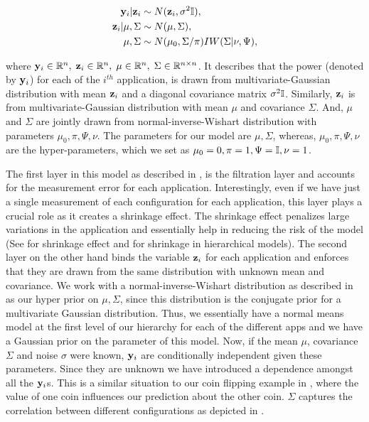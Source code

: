 \begin{equation}
\begin{aligned}
\mathbf{y}_i \vert \mathbf{z}_i  &\sim N( \mathbf{z}_i, \sigma^2 \mathbb{I}),\\
\mathbf{z}_i \vert \mu,\Sigma &\sim N(\mu, \Sigma),\\
\mu, \Sigma &\sim N(\mu_0,\Sigma / \pi)IW(\Sigma | \nu, \Psi),
\end{aligned}
\label{eq:HBN}
\end{equation}

where $\mathbf{y}_i \in \mathbb{R}^n, \;
\mathbf{z}_i \in \mathbb{R}^n, \;
\mu \in \mathbb{R}^{n}, \;
\Sigma \in \mathbb{R}^{n\times n}$. It describes that the power (denoted by $\mathbf{y}_i$) for each of the $i^{th}$ application,  is drawn from multivariate-Gaussian distribution with mean $\mathbf{z}_i$ and a diagonal covariance matrix $\sigma^2\mathbb{I}$. Similarly, $\mathbf{z}_i$ is from multivariate-Gaussian distribution with mean $\mu$ and covariance $\Sigma$. And, $\mu$ and $\Sigma$ are jointly drawn from normal-inverse-Wishart distribution with parameters  $\mu_0, \pi,\Psi, \nu$. The parameters for our model are $\mu,\Sigma$, whereas,  $\mu_0, \pi,\Psi, \nu$ are the hyper-parameters, which we set as $\mu_0 = 0, \pi = 1,\Psi = \mathbb{I}, \nu = 1$.

The first layer in this model as described in , is the filtration layer and accounts for the measurement error for each application. Interestingly, even if we have just a single measurement of each configuration for each application, this layer plays a crucial role as it creates a shrinkage effect. The shrinkage effect penalizes large variations in the application and essentially help in reducing the risk of the model (See \cite{efron1975data} for  shrinkage effect and \cite{morris1983parametric} for shrinkage in hierarchical models). The second layer on the other hand binds the variable $\mathbf{z}_i$ for each application and
enforces that they are drawn from the same distribution with unknown
mean and covariance. We work with a normal-inverse-Wishart distribution as described in \cite{gelman2013bayesian} as our hyper prior on $\mu, \Sigma$, since this distribution is the conjugate prior for a multivariate Gaussian distribution.
Thus, we essentially have a normal means model at
the first level of our hierarchy for each of the different apps and we
have a Gaussian prior on the parameter of this model. Now, if the mean
$\mu$, covariance $\Sigma$ and noise $\sigma$ were known, $\mathbf{y}_i$ are
conditionally independent given these parameters. Since they are
unknown we have introduced a dependence amongst all the $\mathbf{y}_i$s. This
is a similar situation to our coin flipping example in , where the value of one coin influences our prediction
about the other coin. $\Sigma$ captures the correlation between different configurations as depicted in .




